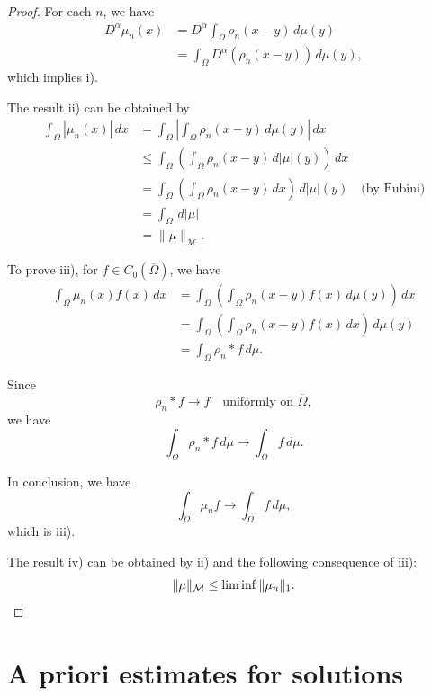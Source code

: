 \documentclass[a4paper, 11pt]{report}
\theoremstyle{definition}\newtheorem*{rmk}{Remark}
\begin{document}
\begin{proof}
\mbox{}

For each $n$, we have
\begin{align*}
D^{\alpha}\mu_n (x) &= D^{\alpha}\int_{\Omega}\rho_n(x-y)\, d\mu(y)\\
&= \int_{\Omega}D^{\alpha}(\rho_n(x-y))\, d\mu(y),
\end{align*}
which implies i).

The result ii) can be obtained by
\begin{align*}
\int_{\Omega}|\mu_n(x)|\,dx&= \int_{\Omega}\left|\int_{\Omega}\rho_n(x-y)\, d\mu(y)\right|\,dx\\
&\le \int_{\Omega}\left(\int_{\Omega}\rho_n(x-y)\, d|\mu|(y)\right)\,dx\\
&= \int_{\Omega}\left(\int_{\Omega}\rho_n(x-y)\,dx\right)\, d|\mu|(y) \quad\text{(by Fubini)}\\
&= \int_{\Omega}\, d|\mu|\\
&= \|\mu\|_{\mathcal{M}}.
\end{align*}

To prove iii), for $f\in C_0(\overline{\Omega})$, we have
\begin{align*}
\int_{\Omega}\mu_n(x) f(x)\, dx &= \int_{\Omega}\left(\int_{\Omega}\rho_n(x-y)f(x)\, d\mu(y)\right)\, dx \\
&= \int_{\Omega}\left(\int_{\Omega}\rho_n(x-y)f(x)\, dx\right)\, d\mu(y)\\
&= \int_{\Omega}\rho_n*f\, d\mu.
\end{align*}

Since
\[
\rho_n*f \to f \quad\text{uniformly on }\overline{\Omega},
\]
we have
\[
\int_{\Omega}\rho_n*f\, d\mu \to \int_{\Omega}f\, d\mu.
\]

In conclusion, we have
\[
\int_{\Omega}\mu_nf \to \int_{\Omega}f\, d\mu,
\]
which is iii).

The result iv) can be obtained by ii) and the following consequence of iii):
\[
\| \mu \|_{\mathcal{M}} \le \liminf \|\mu_n\|_1. \qedhere
\]
\end{proof}

\section{A priori estimates for solutions}
\mbox{}
\end{document}
